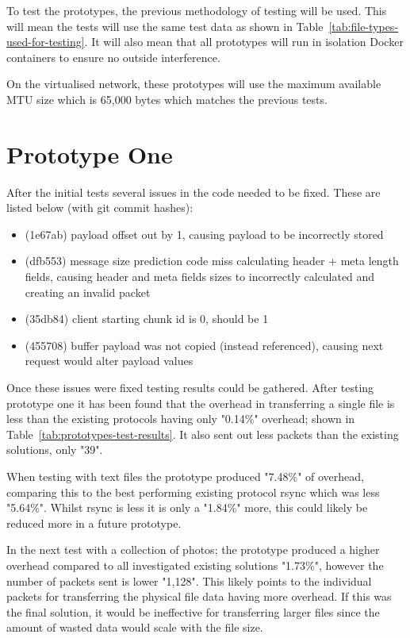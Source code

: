 To test the prototypes, the previous methodology of testing will be used. This will mean the tests will use the same test data as shown in Table~\ref{tab:file-types-used-for-testing}. It will also mean that all prototypes will run in isolation Docker containers to ensure no outside interference.

On the virtualised network, these prototypes will use the maximum available MTU size which is 65,000 bytes which matches the previous tests.

\section{Prototype One}
After the initial tests several issues in the code needed to be fixed. These are listed below (with git commit hashes):

\begin{itemize}
    \item (1e67ab) payload offset out by 1, causing payload to be incorrectly stored
    \item (dfb553) message size prediction code miss calculating header + meta length fields, causing header and meta fields sizes to incorrectly calculated and creating an invalid packet
    \item (35db84) client starting chunk id is 0, should be 1
    \item (455708) buffer payload was not copied (instead referenced), causing next request would alter payload values
\end{itemize}

Once these issues were fixed testing results could be gathered. After testing prototype one it has been found that the overhead in transferring a single file is less than the existing protocols having only "0.14\%" overhead; shown in Table~\ref{tab:prototypes-test-results}. It also sent out less packets than the existing solutions, only "39".

When testing with text files the prototype produced "7.48\%" of overhead, comparing this to the best performing existing protocol rsync which was less "5.64\%". Whilst rsync is less it is only a
"1.84\%" more, this could likely be reduced more in a future prototype.

In the next test with a collection of photos; the prototype produced a higher overhead compared to all investigated existing solutions "1.73\%", however the number of packets sent is lower "1,128". This likely points to the individual packets for transferring the physical file data having more overhead. If this was the final solution, it would be ineffective for transferring larger files since the amount of wasted data would scale with the file size.

